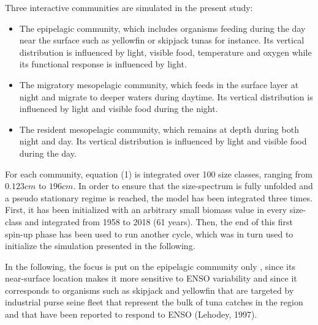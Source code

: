 Three interactive communities are simulated in the present study:
\begin{itemize}
\item{The epipelagic community, which includes organisms feeding during the day near the surface such as yellowfin or skipjack tunas for instance. Its vertical distribution is influenced by light, visible food, temperature and oxygen while its functional response is influenced by light.}
\item{The migratory mesopelagic community, which feeds in the surface layer at night and migrate to deeper waters during daytime. Its vertical distribution is influenced by light and visible food during the night.}
\item{The resident mesopelagic community, which remains at depth during both night and day. Its vertical distribution is influenced by light and visible food during the day.}
\end{itemize}

For each community, equation (1) is integrated over 100 size classes, ranging from $0.123cm$ to $196cm$. In order to ensure that the size-spectrum is fully unfolded and a pseudo stationary regime is reached, the model has been integrated three times. First, it has been initialized with an arbitrary small biomass value in every size-class and integrated from 1958 to 2018 (61 years). Then, the end of this first spin-up phase has been used to run another cycle, which was in turn used to initialize the simulation presented in the following.


In the following, the focus is put on the epipelagic community only , since its near-surface location makes it more sensitive to ENSO variability \citep{lemezoNaturalVariabilityMarine2016} and since it corresponds to organisms such as skipjack and yellowfin that are targeted by industrial purse seine fleet that represent the bulk of tuna catches in the region and that have been reported to respond to ENSO (Lehodey, 1997).
